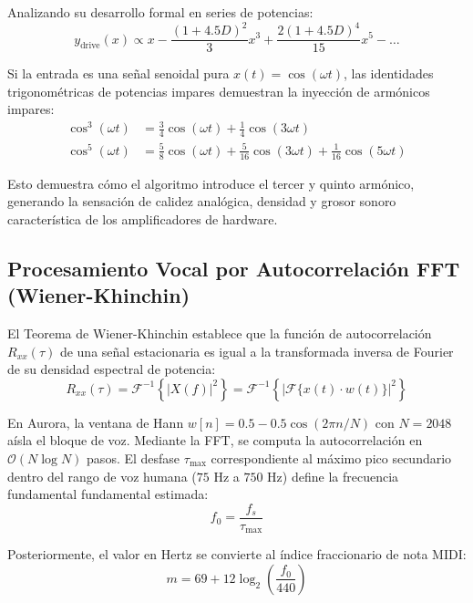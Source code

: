 \documentclass[11pt,a4paper]{article}
\begin{document}
Analizando su desarrollo formal en series de potencias:
\begin{equation}
y_{\text{drive}}(x) \propto x - \frac{(1+4.5D)^2}{3} x^3 + \frac{2(1+4.5D)^4}{15} x^5 - \dots
\end{equation}

Si la entrada es una señal senoidal pura $x(t) = \cos(\omega t)$, las identidades trigonométricas de potencias impares demuestran la inyección de armónicos impares:
\begin{align}
\cos^3(\omega t) &= \frac{3}{4}\cos(\omega t) + \frac{1}{4}\cos(3\omega t) \\
\cos^5(\omega t) &= \frac{5}{8}\cos(\omega t) + \frac{5}{16}\cos(3\omega t) + \frac{1}{16}\cos(5\omega t)
\end{align}

Esto demuestra cómo el algoritmo introduce el tercer y quinto armónico, generando la sensación de calidez analógica, densidad y grosor sonoro característica de los amplificadores de hardware.

\subsection{Procesamiento Vocal por Autocorrelación FFT (Wiener-Khinchin)}
El Teorema de Wiener-Khinchin establece que la función de autocorrelación $R_{xx}(\tau)$ de una señal estacionaria es igual a la transformada inversa de Fourier de su densidad espectral de potencia:
\begin{equation}
R_{xx}(\tau) = \mathcal{F}^{-1}\left\{ |X(f)|^2 \right\} = \mathcal{F}^{-1}\left\{ |\mathcal{F}\{x(t) \cdot w(t)\}|^2 \right\}
\end{equation}

En Aurora, la ventana de Hann $w[n] = 0.5 - 0.5 \cos(2\pi n / N)$ con $N = 2048$ aísla el bloque de voz. Mediante la FFT, se computa la autocorrelación en $\mathcal{O}(N \log N)$ pasos. El desfase $\tau_{\text{max}}$ correspondiente al máximo pico secundario dentro del rango de voz humana ($75\text{ Hz}$ a $750\text{ Hz}$) define la frecuencia fundamental fundamental estimada:
\begin{equation}
f_0 = \frac{f_s}{\tau_{\text{max}}}
\end{equation}

Posteriormente, el valor en Hertz se convierte al índice fraccionario de nota MIDI:
\begin{equation}
m = 69 + 12 \log_2\left(\frac{f_0}{440}\right)
\end{equation}
\end{document}
